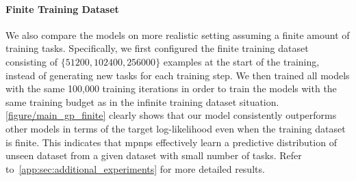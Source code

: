 
\paragraph{Finite Training Dataset}
We also compare the models on more realistic setting assuming a finite amount of training tasks. Specifically, we first configured the finite training dataset consisting of $\{51200, 102400, 256000\}$ examples at the start of the training, instead of generating new tasks for each training step. We then trained all models with the same 100,000 training iterations in order to train the models with the same training budget as in the infinite training dataset situation. \cref{figure/main_gp_finite} clearly shows that our model consistently outperforms other models in terms of the target log-likelihood even when the training dataset is finite. This indicates that \glspl{mpnp} effectively learn a predictive distribution of unseen dataset from a given dataset with small number of tasks. Refer to~\cref{app:sec:additional_experiments} for more detailed results.


